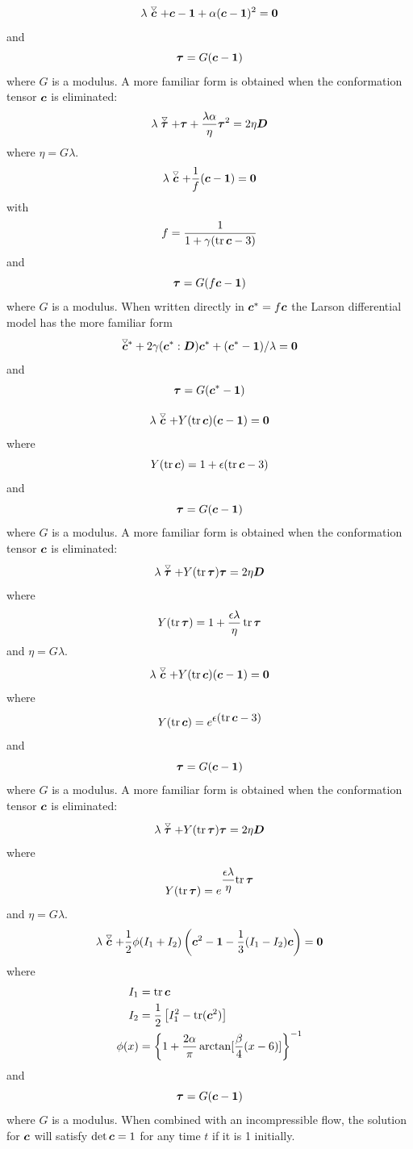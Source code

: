 \[
  \lambda\stackrel{\scriptscriptstyle\bigtriangledown}{\boldsymbol{c}}+\boldsymbol{c}-\boldsymbol{1}+\alpha(\boldsymbol{c}-\boldsymbol{1})^2=\boldsymbol{0}
\]
and
\[
     \boldsymbol{\tau}=G(\boldsymbol{c} - \boldsymbol{1})
\]
where $G$ is a modulus. A more familiar form is obtained when
the conformation tensor $\boldsymbol{c}$ is eliminated:
\[
  \lambda\stackrel{\scriptscriptstyle\bigtriangledown}{\boldsymbol{\tau}}+\boldsymbol{\tau}+\frac{\lambda\alpha}{\eta} \boldsymbol{\tau}^2
           =2\eta\boldsymbol{D}
\]
where $\eta=G\lambda$.
\[
 \lambda\stackrel{\scriptscriptstyle\bigtriangledown}{\boldsymbol{c}}+\frac{1}{f}({\boldsymbol{c}}-\boldsymbol{1})=\boldsymbol{0}
\]
with
\[
      f=\frac{1}{1+\gamma(\operatorname{tr}{\boldsymbol{c}}-3)}
\]
and
\[
     \boldsymbol{\tau}=G(f\boldsymbol{c} - \boldsymbol{1})
\]
where $G$ is a modulus. When written directly in $\boldsymbol{c}^*=f\boldsymbol{c}$ the
Larson differential model has the more familiar form
\[
 \stackrel{\scriptscriptstyle\bigtriangledown}{\boldsymbol{c}}\!\!{}^*+2\gamma({\boldsymbol{c}^*}:\boldsymbol{D}){\boldsymbol{c}^*}+({\boldsymbol{c}^*}-\boldsymbol{1})/\lambda=\boldsymbol{0}
\]
and
\[
     \boldsymbol{\tau}=G(\boldsymbol{c}^* - \boldsymbol{1})
\]

\[
  \lambda\stackrel{\scriptscriptstyle\bigtriangledown}{\boldsymbol{c}}+Y(\operatorname{tr}\boldsymbol{c})(\boldsymbol{c}-\boldsymbol{1})=\boldsymbol{0}
\]
where 
\[
   Y(\operatorname{tr}\boldsymbol{c})= 1+\epsilon(\operatorname{tr}\boldsymbol{c} - 3)
\]
and
\[
     \boldsymbol{\tau}=G(\boldsymbol{c} - \boldsymbol{1})
\]
where $G$ is a modulus. A more familiar form is obtained when
the conformation tensor $\boldsymbol{c}$ is eliminated:
\[
  \lambda\stackrel{\scriptscriptstyle\bigtriangledown}{\boldsymbol{\tau}}+Y(\operatorname{tr}\boldsymbol{\tau})\boldsymbol{\tau}=2\eta\boldsymbol{D}
\]
where 
\[
   Y(\operatorname{tr}\boldsymbol{\tau})= 1+\frac{\epsilon\lambda}{\eta}\operatorname{tr}\boldsymbol{\tau}
\]
and $\eta=G\lambda$.
\[
  \lambda\stackrel{\scriptscriptstyle\bigtriangledown}{\boldsymbol{c}}+Y(\operatorname{tr}\boldsymbol{c})(\boldsymbol{c}-\boldsymbol{1})=\boldsymbol{0}
\]
where 
\[
   Y(\operatorname{tr}\boldsymbol{c})= e^{\displaystyle \epsilon(\operatorname{tr}\boldsymbol{c} - 3)}
\]
and
\[
     \boldsymbol{\tau}=G(\boldsymbol{c} - \boldsymbol{1})
\]
where $G$ is a modulus. A more familiar form is obtained when
the conformation tensor $\boldsymbol{c}$ is eliminated:
\[
  \lambda\stackrel{\scriptscriptstyle\bigtriangledown}{\boldsymbol{\tau}}+Y(\operatorname{tr}\boldsymbol{\tau})\boldsymbol{\tau}=2\eta\boldsymbol{D}
\]
where 
\[
   Y(\operatorname{tr}\boldsymbol{\tau})=
   e^{\displaystyle\frac{\epsilon\lambda}{\eta}{\rm tr}\,\boldsymbol{\tau}}
\]
and $\eta=G\lambda$.
\[
  \lambda\stackrel{\scriptscriptstyle\bigtriangledown}{\boldsymbol{c}}+\frac12\phi(I_{1}+I_{2})\left({\boldsymbol{c}}^2-\boldsymbol{1}
                   -\frac13(I_{1}-I_{2}){\boldsymbol{c}}\right) = \boldsymbol{0}
\]
where
\begin{align*}
    I_{1}&=\operatorname{tr}{\boldsymbol{c}}\\
    I_{2}&=\frac12\left[I_{1}^2-\operatorname{tr}({\boldsymbol{c}}^2)\right]\\
        \phi(x)&=\left\{1+\frac{2\alpha}{\pi}
                 \arctan[\frac{\beta}{4}(x-6)]\right\}^{-1}
\end{align*}
and
\[
     \boldsymbol{\tau}=G(\boldsymbol{c} - \boldsymbol{1})
\]
where $G$ is a modulus. When combined with an incompressible flow, the solution for $\boldsymbol{c}$ will satisfy $\det\boldsymbol{c}=1$ for any time $t$ if it is 1 initially.

